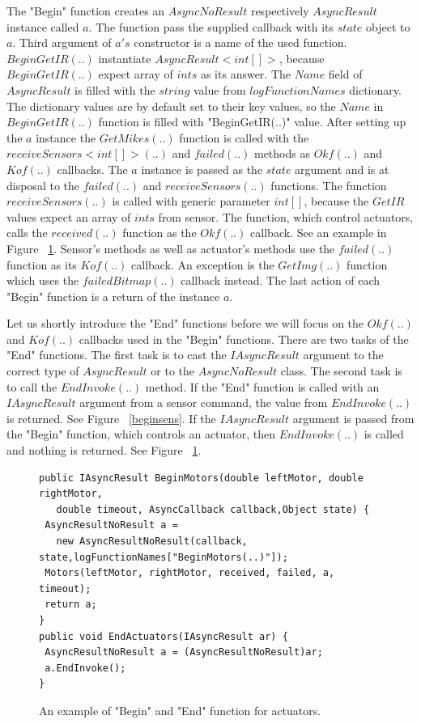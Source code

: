 \documentclass[12pt,notitlepage]{report}
\begin{document}
	The "Begin" function creates an $AsyncNoResult$ respectively $AsyncResult$ instance called $a$. 
	The function pass the supplied callback with its $state$ object to
	$a$. Third argument of $a's$ constructor is a name of the used function.
	$BeginGetIR(..)$ instantiate $AsyncResult<int[]>$, because $BeginGetIR(..)$
	expect array of $ints$ as its answer. 
	The $Name$ field of $AsyncResult$ is filled with the $string$ value from $logFunctionNames$ dictionary. 
	The dictionary values are by default set to their key values, so
	the $Name$ in $BeginGetIR(..)$ function is filled with "BeginGetIR(..)" value.
	After setting up the $a$ instance the $GetMikes(..)$ function is called with the $receiveSensors<int[]>(..)$ and 
	$failed(..)$ methods as $Okf(..)$ and $Kof(..)$ callbacks.
	The $a$ instance is passed as the $state$ argument and is at disposal to the $failed(..)$ and 
	$receiveSensors(..)$ functions.
	The function $receiveSensors(..)$ is called with generic parameter $int[]$, 
	because the $GetIR$ values expect an array of $ints$ from sensor.
	The function, which control actuators, calls the $received(..)$ function as the $Okf(..)$ callback. 
	See an example in Figure ~\ref{beginact}.
	Sensor's methods as well as actuator's methods use the $failed(..)$ function as its $Kof(..)$ callback.
	An exception is the $GetImg(..)$ function which uses the $failedBitmap(..)$ callback instead.
	The last action of each "Begin" function is a return of the instance $a$.

	Let us shortly introduce the "End" functions before we will focus on the $Okf(..)$ and 
	$Kof(..)$ callbacks used in the "Begin" functions.
	There are two tasks of the "End" functions.
	The first task  is to cast the $IAsyncResult$ argument to the correct type of $AsyncResult$ 
	or to the $AsyncNoResult$ class. The second task is to call the $EndInvoke(..)$ method.
	If the "End" function is called with an $IAsyncResult$ argument from a sensor command, 
	the value from $EndInvoke(..)$ is returned. See Figure ~\ref{beginsens}. 
	If the $IAsyncResult$ argument is passed from the "Begin" function, 
	which controls an actuator, then $EndInvoke(..)$ is called and nothing is returned. See Figure ~\ref{beginact}.
	
\begin{figure}[!hbp]
\begin{lstlisting}
public IAsyncResult BeginMotors(double leftMotor, double rightMotor, 
   double timeout, AsyncCallback callback,Object state) {
 AsyncResultNoResult a = 
   new AsyncResultNoResult(callback, state,logFunctionNames["BeginMotors(..)"]);
 Motors(leftMotor, rightMotor, received, failed, a, timeout);
 return a;
}
public void EndActuators(IAsyncResult ar) {
 AsyncResultNoResult a = (AsyncResultNoResult)ar;
 a.EndInvoke();
}
\end{lstlisting}	
\caption{An example of "Begin" and "End" function for actuators.} \label{beginact}
\end{figure}
	
\end{document}
